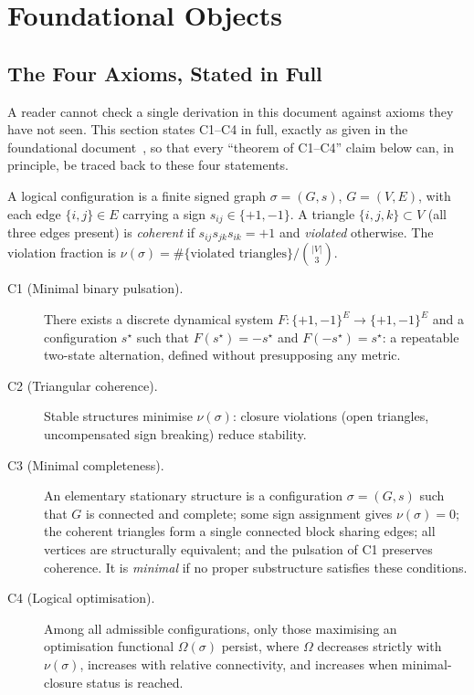 \documentclass[11pt,a4paper]{article}
\begin{document}
\section{Foundational Objects}
\label{sec:foundations}

\subsection{The Four Axioms, Stated in Full}
\label{sec:axioms}

A reader cannot check a single derivation in this document against axioms they have not seen. This section states C1--C4 in full, exactly as given in the foundational document~\citep{D01}, so that every ``theorem of C1--C4'' claim below can, in principle, be traced back to these four statements.

A logical configuration is a finite signed graph $\sigma=(G,s)$, $G=(V,E)$, with each edge $\{i,j\}\in E$ carrying a sign $s_{ij}\in\{+1,-1\}$. A triangle $\{i,j,k\}\subset V$ (all three edges present) is \emph{coherent} if $s_{ij}s_{jk}s_{ik}=+1$ and \emph{violated} otherwise. The violation fraction is $\nu(\sigma)=\#\{\text{violated triangles}\}/\binom{|V|}{3}$.

\begin{description}
\item[C1 (Minimal binary pulsation).] There exists a discrete dynamical system $F:\{+1,-1\}^E\to\{+1,-1\}^E$ and a configuration $s^\star$ such that $F(s^\star)=-s^\star$ and $F(-s^\star)=s^\star$: a repeatable two-state alternation, defined without presupposing any metric.
\item[C2 (Triangular coherence).] Stable structures minimise $\nu(\sigma)$: closure violations (open triangles, uncompensated sign breaking) reduce stability.
\item[C3 (Minimal completeness).] An elementary stationary structure is a configuration $\sigma=(G,s)$ such that $G$ is connected and complete; some sign assignment gives $\nu(\sigma)=0$; the coherent triangles form a single connected block sharing edges; all vertices are structurally equivalent; and the pulsation of C1 preserves coherence. It is \emph{minimal} if no proper substructure satisfies these conditions.
\item[C4 (Logical optimisation).] Among all admissible configurations, only those maximising an optimisation functional $\Omega(\sigma)$ persist, where $\Omega$ decreases strictly with $\nu(\sigma)$, increases with relative connectivity, and increases when minimal-closure status is reached.
\end{description}
\end{document}
